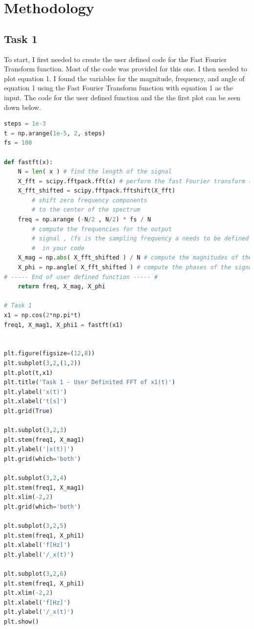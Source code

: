 \documentclass[12pt]{report}
\begin{document}
\section{Methodology}
\subsection{Task 1}
To start, I first needed to create the user defined code for the Fast
Fourier Transform function. Most of the code was provided for this one.
I then needed to plot equation 1. I found the variables for the magnitude,
frequency, and angle of equation 1 using the Fast Fourier Transform
function with equation 1 as the input. The code for the user defined
function and the the first plot can be seen down below.
\begin{lstlisting}[language=Python]
steps = 1e-3
t = np.arange(1e-5, 2, steps)
fs = 100

def fastft(x):
    N = len( x ) # find the length of the signal
    X_fft = scipy.fftpack.fft(x) # perform the fast Fourier transform (fft)
    X_fft_shifted = scipy.fftpack.fftshift(X_fft) 
        # shift zero frequency components
        # to the center of the spectrum
    freq = np.arange (-N/2 , N/2) * fs / N 
        # compute the frequencies for the output
        # signal , (fs is the sampling frequency a needs to be defined previously 
        #  in your code
    X_mag = np.abs( X_fft_shifted ) / N # compute the magnitudes of the signal
    X_phi = np.angle( X_fft_shifted ) # compute the phases of the signal
# ----- End of user defined function ----- #    
    return freq, X_mag, X_phi

# Task 1
x1 = np.cos(2*np.pi*t)
freq1, X_mag1, X_phi1 = fastft(x1)


plt.figure(figsize=(12,8))
plt.subplot(3,2,(1,2))
plt.plot(t,x1)
plt.title('Task 1 - User Definited FFT of x1(t)')
plt.ylabel('x(t)')
plt.xlabel('t[s]')
plt.grid(True)

plt.subplot(3,2,3)
plt.stem(freq1, X_mag1)
plt.ylabel('|x(t)|') 
plt.grid(which='both')

plt.subplot(3,2,4)
plt.stem(freq1, X_mag1) 
plt.xlim(-2,2)
plt.grid(which='both')

plt.subplot(3,2,5)
plt.stem(freq1, X_phi1)
plt.xlabel('f[Hz]') 
plt.ylabel('/_x(t)') 

plt.subplot(3,2,6)
plt.stem(freq1, X_phi1)
plt.xlim(-2,2)
plt.xlabel('f[Hz]') 
plt.ylabel('/_x(t)') 
plt.show()
\end{lstlisting}
\newpage
\end{document}
